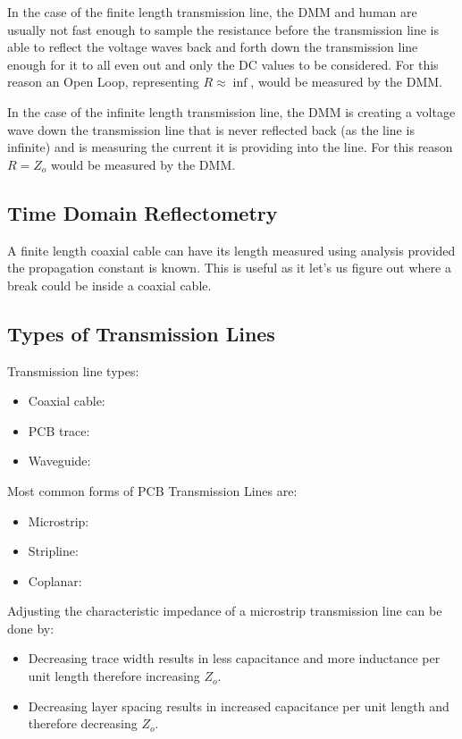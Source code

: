 \documentclass[main.tex]{subfiles}
\begin{document}
In the case of the finite length transmission line, the DMM and human are usually not fast enough to sample the resistance before the transmission line is able to reflect the voltage waves back and forth down the transmission line enough for it to all even out and only the DC values to be considered. For this reason an Open Loop, representing $R \approx \inf$, would be measured by the DMM. 

In the case of the infinite length transmission line, the DMM is creating a voltage wave down the transmission line that is never reflected back (as the line is infinite) and is measuring the current it is providing into the line. For this reason $R = Z_o$ would be measured by the DMM.

\subsection{Time Domain Reflectometry}
A finite length coaxial cable can have its length measured using  analysis provided the propagation constant is known. This is useful as it let's us figure out where a break could be inside a coaxial cable. 

\subsection{Types of Transmission Lines}
Transmission line types:
\begin{itemize}
    \item Coaxial cable: 
    \item PCB trace:
    \item Waveguide: 
\end{itemize}

Most common forms of PCB Transmission Lines are:
\begin{itemize}
    \item Microstrip: 
    \item Stripline: 
    \item Coplanar: 
\end{itemize}

Adjusting the characteristic impedance of a microstrip transmission line can be done by:
\begin{itemize}
    \item Decreasing trace width results in less capacitance and more inductance per unit length therefore increasing $Z_o$.
    \item Decreasing layer spacing results in increased capacitance per unit length and therefore decreasing $Z_o$.
\end{itemize}
\end{document}
